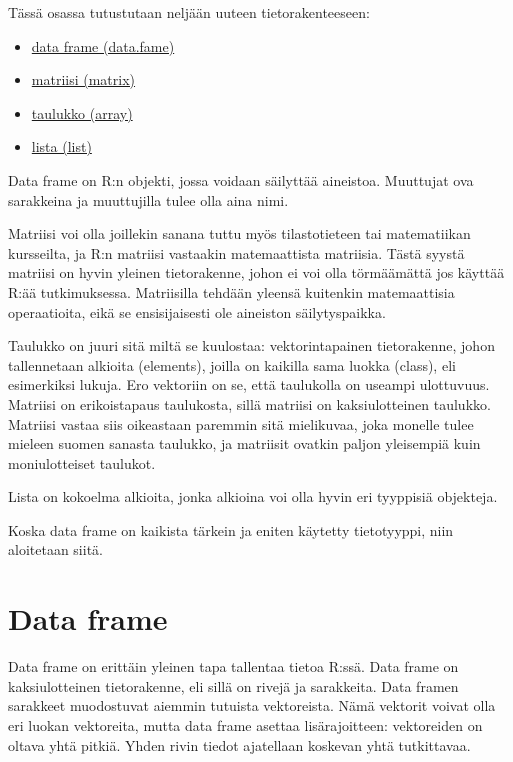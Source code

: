 \documentclass[
]{book}
\providecommand{\tightlist}{%
  \setlength{\itemsep}{0pt}\setlength{\parskip}{0pt}}
\begin{document}
Tässä osassa tutustutaan neljään uuteen tietorakenteeseen:

\begin{itemize}
\tightlist
\item
  \protect\hyperlink{data-frame}{data frame (data.fame)}
\item
  \protect\hyperlink{matriisi}{matriisi (matrix)}
\item
  \protect\hyperlink{taulukko}{taulukko (array)}
\item
  \protect\hyperlink{lista}{lista (list)}
\end{itemize}

Data frame on R:n objekti, jossa voidaan säilyttää aineistoa. Muuttujat ova sarakkeina ja muuttujilla tulee olla aina nimi.

Matriisi voi olla joillekin sanana tuttu myös tilastotieteen tai matematiikan kursseilta, ja R:n matriisi vastaakin matemaattista matriisia. Tästä syystä matriisi on hyvin yleinen tietorakenne, johon ei voi olla törmäämättä jos käyttää R:ää tutkimuksessa. Matriisilla tehdään yleensä kuitenkin matemaattisia operaatioita, eikä se ensisijaisesti ole aineiston säilytyspaikka.

Taulukko on juuri sitä miltä se kuulostaa: vektorintapainen tietorakenne, johon tallennetaan alkioita (elements), joilla on kaikilla sama luokka (class), eli esimerkiksi lukuja. Ero vektoriin on se, että taulukolla on useampi ulottuvuus. Matriisi on erikoistapaus taulukosta, sillä matriisi on kaksiulotteinen taulukko. Matriisi vastaa siis oikeastaan paremmin sitä mielikuvaa, joka monelle tulee mieleen suomen sanasta taulukko, ja matriisit ovatkin paljon yleisempiä kuin moniulotteiset taulukot.

Lista on kokoelma alkioita, jonka alkioina voi olla hyvin eri tyyppisiä objekteja.

Koska data frame on kaikista tärkein ja eniten käytetty tietotyyppi, niin aloitetaan siitä.

\hypertarget{data-frame}{%
\section{Data frame}\label{data-frame}}

Data frame on erittäin yleinen tapa tallentaa tietoa R:ssä. Data frame on kaksiulotteinen tietorakenne, eli sillä on rivejä ja sarakkeita. Data framen sarakkeet muodostuvat aiemmin tutuista vektoreista. Nämä vektorit voivat olla eri luokan vektoreita, mutta data frame asettaa lisärajoitteen: vektoreiden on oltava yhtä pitkiä. Yhden rivin tiedot ajatellaan koskevan yhtä tutkittavaa.
\end{document}
